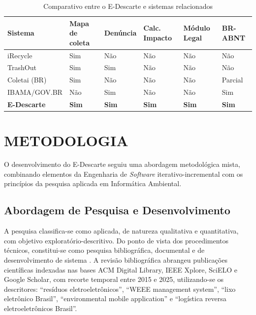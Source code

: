 \documentclass[12pt, a4paper]{article}
\numberwithin{equation}{section}
\numberwithin{figure}{section}
\numberwithin{table}{section}
\begin{document}
\begin{table}[H]
  \centering
  \caption{Comparativo entre o E-Descarte e sistemas relacionados}
  \label{tab:comparativo}
  \begin{tabularx}{\textwidth}{|l|X|X|X|X|X|}
    \hline
    \textbf{Sistema} &
    \textbf{Mapa de coleta} &
    \textbf{Denúncia} &
    \textbf{Calc. Impacto} &
    \textbf{Módulo Legal} &
    \textbf{BR-ABNT} \\
    \hline
    iRecycle       & Sim & Não & Não & Não & Não \\
    \hline
    TrashOut       & Sim & Sim & Não & Não & Não \\
    \hline
    Coletai (BR)   & Sim & Não & Não & Não & Parcial \\
    \hline
    IBAMA/GOV.BR   & Não & Sim & Não & Não & Sim \\
    \hline
    \textbf{E-Descarte} &
    \textbf{Sim} & \textbf{Sim} & \textbf{Sim} & \textbf{Sim} & \textbf{Sim} \\
    \hline
  \end{tabularx}
\end{table}

\section{METODOLOGIA}

O desenvolvimento do E-Descarte seguiu uma abordagem metodológica mista,
combinando elementos da Engenharia de \textit{Software} iterativo-incremental
com os princípios da pesquisa aplicada em Informática Ambiental.

\subsection{Abordagem de Pesquisa e Desenvolvimento}

A pesquisa classifica-se como aplicada, de natureza qualitativa e quantitativa,
com objetivo exploratório-descritivo. Do ponto de vista dos procedimentos
técnicos, constitui-se como pesquisa bibliográfica, documental e de
desenvolvimento de sistema \cite{gil2017}. A revisão bibliográfica abrangeu
publicações científicas indexadas nas bases ACM Digital Library, IEEE Xplore,
SciELO e Google Scholar, com recorte temporal entre 2015 e 2025, utilizando-se
os descritores: ``resíduos eletroeletrônicos'', ``WEEE management system'',
``lixo eletrônico Brasil'', ``environmental mobile application'' e
``logística reversa eletroeletrônicos Brasil''.
\end{document}
